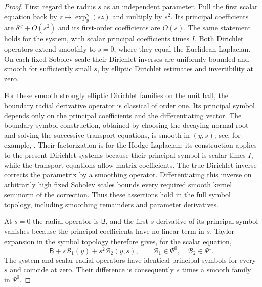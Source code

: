\begin{proof}
First regard the radius $s$ as an independent parameter.  Pull the first
scalar equation back by $z\mapsto\exp_y^\gamma(sz)$ and multiply by
$s^2$.  Its principal coefficients are $\delta^{ij}+O(s^2)$ and its
first-order coefficients are $O(s)$.  The same statement holds for the
system, with scalar principal coefficients times $I$.  Both Dirichlet
operators extend smoothly to $s=0$, where they equal the Euclidean
Laplacian.  On each fixed Sobolev scale their Dirichlet inverses are
uniformly bounded and smooth for sufficiently small $s$, by elliptic
Dirichlet estimates and invertibility at zero.

For these smooth strongly elliptic Dirichlet families on the unit ball,
the boundary radial derivative operator is classical of order one.  Its
principal symbol depends only on the principal coefficients and the
differentiating vector.  The boundary symbol construction, obtained by
choosing the decaying normal root and solving the successive transport
equations, is smooth in $(y,s)$; see, for example,
\citet[Section~3, Proposition~3.1]{JoshiLionheart2005}.
Their factorization is for the Hodge Laplacian; its construction applies
to the present Dirichlet systems because their
principal symbol is scalar times $I$, while the transport equations
allow matrix coefficients.  The true Dirichlet inverse corrects the
parametrix by a smoothing operator.  Differentiating this inverse on
arbitrarily high fixed Sobolev scales bounds every required smooth
kernel seminorm of the correction.  Thus these assertions hold in the
full symbol topology, including smoothing remainders and parameter
derivatives.

At $s=0$ the radial operator is $\mathsf B$, and the first $s$-derivative
of its principal symbol vanishes because the principal coefficients
have no linear term in $s$.  Taylor expansion in the symbol topology
therefore gives, for the scalar equation,
\begin{equation}\label{ang:radial-expansion}
 \mathsf B+s\mathcal B_1(y)+s^2\mathcal B_2(y,s),
 \qquad \mathcal B_1\in\Psi^0,\quad\mathcal B_2\in\Psi^1.
\end{equation}
The system and scalar radial operators have identical principal
symbols for every $s$ and coincide at zero.  Their difference is
consequently $s$ times a smooth family in $\Psi^0$.


\end{proof}
